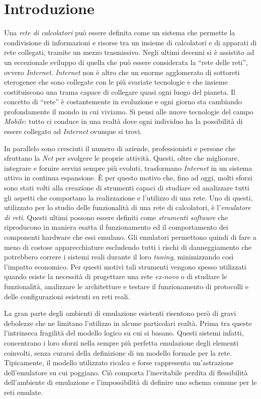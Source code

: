 \chapter*{Introduzione}

Una \emph{rete di calcolatori} può essere definita come un sistema che permette la condivisione di informazioni e risorse tra un insieme di calcolatori e di apparati di rete collegati, tramite un mezzo trasmissivo.
Negli ultimi decenni si è assistito ad un eccezionale sviluppo di quella che può essere considerata la ``rete delle reti'', ovvero \emph{Internet}.
\emph{Internet} non è altro che un enorme agglomerato di sottoreti eterogenee che sono collegate con le più svariate tecnologie e che insieme costituiscono una trama capace di collegare quasi ogni luogo del pianeta. Il concetto di ``rete'' è costantemente in evoluzione e ogni giorno sta cambiando profondamente il mondo in cui viviamo. Si pensi alle nuove tecnologie del campo \emph{Mobile}: tutto ci conduce in una realtà dove ogni individuo ha la possibilità di essere collegato ad \emph{Internet} ovunque si trovi.

In parallelo sono cresciuti il numero di aziende, professionisti e persone che sfruttano la \emph{Net} per svolgere le proprie attività. Questi, oltre che migliorare, integrare e fornire servizi sempre più evoluti, trasformano \emph{Internet} in un sistema attivo in continua espansione.
È per questo motivo che, fino ad oggi, molti sforzi sono stati volti alla creazione di strumenti capaci di studiare ed analizzare tutti gli aspetti che comportano la realizzazione e l'utilizzo di una rete.
Uno di questi, utilizzato per lo studio delle funzionalità di una rete di calcolatori, è l'\emph{emulatore di reti}. Questi ultimi possono essere definiti come \emph{strumenti software} che riproducono in maniera esatta il funzionamento ed il comportamento dei componenti hardware che essi emulano. Gli emulatori permettono quindi di fare a meno di costose apparecchiature escludendo tutti i rischi di danneggiamento che potrebbero correre i sistemi reali durante il loro \emph{tuning}, minimizzando così l'impatto economico.
Per questi motivi tali strumenti vengono spesso utilizzati quando esiste la necessità di progettare una rete \emph{ex-novo} o di studiare le funzionalità, analizzare le architetture e testare il funzionamento di protocolli e delle configurazioni esistenti su reti reali.

La gran parte degli ambienti di emulazione esistenti risentono però di gravi debolezze che ne limitano l'utilizzo in alcune particolari realtà. Prima tra queste l'intrinseca fragilità del modello logico su cui si basano.
Questi sistemi infatti, concentrano i loro sforzi nella sempre più perfetta emulazione degli elementi coinvolti, senza curarsi della definizione di un modello formale per la rete.
Tipicamente, il modello utilizzato ricalca e forse rappresenta un'astrazione dell'emulatore su cui poggiano. Ciò comporta l'inevitabile perdita di flessibilità dell'ambiente di emulazione e l'impossibilità di definire uno schema comune per le reti emulate.

